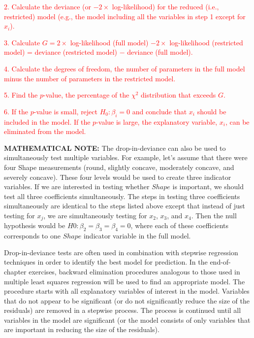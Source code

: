 \documentclass[
]{report}
\begin{document}
\textcolor{red}{2. Calculate the deviance (or $-2 \times$ log-likelihood) for the reduced (i.e., restricted) model (e.g., the model including all the variables in step 1 except for $x_i$).}

\textcolor{red}{3. Calculate $G = 2 \times$ log-likelihood (full model) $-2 \times$ log-likelihood (restricted model) = deviance (restricted model) $-$ deviance (full model).}

\textcolor{red}{4. Calculate the degrees of freedom, the number of parameters in the full model minus the number of parameters in the restricted model.}

\textcolor{red}{5. Find the $p$-value, the percentage of the $\chi^2$ distribution that exceeds $G$.}

\textcolor{red}{6. If the $p$-value is small, reject $H_0: \beta_i = 0$ and conclude that $x_i$ should be included in the model. If the $p$-value is large, the explanatory variable, $x_i$, can be eliminated from the model.}
\normalsize

\large

\textbf{MATHEMATICAL NOTE:}
The drop-in-deviance can also be used to simultaneously test multiple variables. For example, let's assume
that there were four Shape measurements (round, slightly concave, moderately concave, and severely
concave). These four levels would be used to create three indicator variables. If we are interested in
testing whether \(Shape\) is important, we should test all three coefficients simultaneously. The steps in
testing three coefficients simultaneously are identical to the steps listed above except that instead of
just testing for \(x_j\), we are simultaneously testing for \(x_2\), \(x_3\), and \(x_4\). Then the null hypothesis would be
\(H0: \beta_2 = \beta_3 = \beta_4 = 0\), where each of these coefficients corresponds to one \(Shape\) indicator variable
in the full model.
\normalsize 

Drop-in-deviance tests are often used in combination with stepwise regression techniques in order to
identify the best model for prediction. In the end-of-chapter exercises, backward elimination procedures
analogous to those used in multiple least squares regression will be used to find an appropriate model. The
procedure starts with all explanatory variables of interest in the model. Variables that do not appear to be
significant (or do not significantly reduce the size of the residuals) are removed in a stepwise process. The
process is continued until all variables in the model are significant (or the model consists of only variables
that are important in reducing the size of the residuals).
\end{document}
